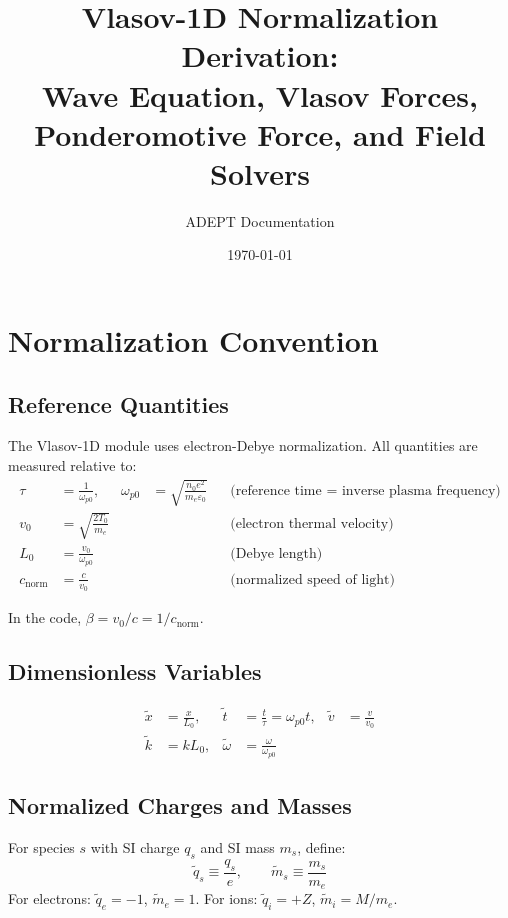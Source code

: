 \documentclass[11pt]{article}
\title{Vlasov-1D Normalization Derivation:\\Wave Equation, Vlasov Forces, Ponderomotive Force, and Field Solvers}
\author{ADEPT Documentation}
\date{\today}
\newcommand{\tl}[1]{\tilde{#1}}
\newcommand{\cnorm}{c_{\text{norm}}}
\newcommand{\wpz}{\omega_{p0}}
\newcommand{\tq}{\tl{q}}
\newcommand{\tm}{\tl{m}}
\begin{document}
\maketitle
\tableofcontents
\newpage

\section{Normalization Convention}

\subsection{Reference Quantities}

The Vlasov-1D module uses electron-Debye normalization. All quantities are measured relative to:
\begin{align}
    \tau &= \frac{1}{\wpz}, &
    \wpz &= \sqrt{\frac{n_0 e^2}{m_e \varepsilon_0}}
    && \text{(reference time = inverse plasma frequency)} \\[6pt]
    v_0 &= \sqrt{\frac{2T_0}{m_e}}
    && && \text{(electron thermal velocity)} \\[6pt]
    L_0 &= \frac{v_0}{\wpz}
    && && \text{(Debye length)} \\[6pt]
    \cnorm &= \frac{c}{v_0}
    && && \text{(normalized speed of light)}
\end{align}

In the code, $\beta = v_0/c = 1/\cnorm$.

\subsection{Dimensionless Variables}

\begin{align}
    \tl{x} &= \frac{x}{L_0}, &
    \tl{t} &= \frac{t}{\tau} = \wpz t, &
    \tl{v} &= \frac{v}{v_0} \\[6pt]
    \tl{k} &= k L_0, &
    \tl{\omega} &= \frac{\omega}{\wpz}
\end{align}

\subsection{Normalized Charges and Masses}

For species $s$ with SI charge $q_s$ and SI mass $m_s$, define:
\begin{equation}
    \tq_s \equiv \frac{q_s}{e}, \qquad \tm_s \equiv \frac{m_s}{m_e}
    \label{eq:qm-def}
\end{equation}
For electrons: $\tq_e = -1$, $\tm_e = 1$. For ions: $\tq_i = +Z$, $\tm_i = M/m_e$.
\end{document}
